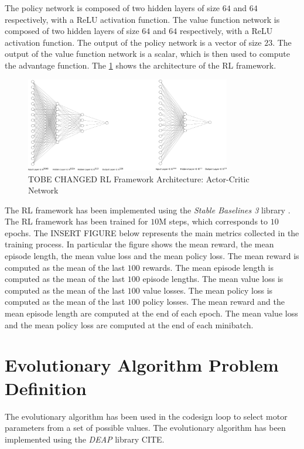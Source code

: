 The policy network is composed of two hidden layers of size $64$ and $64$ respectively, with a \ac{ReLU} activation function. The value function network is composed of two hidden layers of size $64$ and $64$ respectively, with a \ac{ReLU} activation function. The output of the policy network is a vector of size $23$. The output of the value function network is a scalar, which is then used to compute the advantage function. The \cref{fig:rlarchitecture} shows the architecture of the \ac{RL} framework.

\begin{figure}[h]
    \centering
    \includegraphics[width=0.8\textwidth]{Images/rl_architecture.png}
    \caption{TOBE CHANGED RL Framework Architecture: Actor-Critic Network}
    \label{fig:rlarchitecture}
\end{figure}

The \ac{RL} framework has been implemented using the \textit{Stable Baselines 3} library \cite{raffin_stable-baselines3_2021}. The \ac{RL} framework has been trained for $10$M steps, which corresponds to $10$ epochs. The INSERT FIGURE below represents the main metrics collected in the training process. In particular the figure shows the mean reward, the mean episode length, the mean value loss and the mean policy loss. The mean reward is computed as the mean of the last $100$ rewards. The mean episode length is computed as the mean of the last $100$ episode lengths. The mean value loss is computed as the mean of the last $100$ value losses. The mean policy loss is computed as the mean of the last $100$ policy losses. The mean reward and the mean episode length are computed at the end of each epoch. The mean value loss and the mean policy loss are computed at the end of each minibatch.


\section{Evolutionary Algorithm Problem Definition}

The evolutionary algorithm has been used in the codesign loop to select motor parameters from a set of possible values. The evolutionary algorithm has been implemented using the \textit{DEAP} library CITE.

